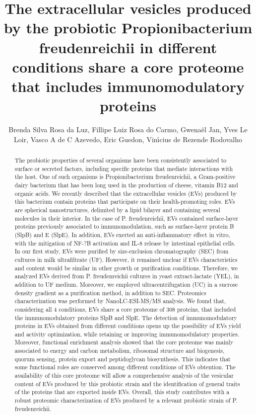\documentclass[twoside]{article}
\title{\vspace{-15mm}\fontsize{24pt}{10pt}\selectfont\textbf{ The extracellular vesicles produced by the probiotic Propionibacterium freudenreichii in different conditions share a core proteome that includes immunomodulatory proteins }} %
\author{ Brenda Silva Rosa da Luz,  Fillipe Luiz Rosa do Carmo,  Gwenaël Jan,  Yves Le Loir,  Vasco A de C Azevedo,  Eric Guedon,  Vin\'{\i}cius de Rezende Rodovalho }
\affil{ INAPG- Fran\c{c}a,  UNIVERSIDADE FEDERAL DE MINAS GERAIS,  UNIVERSIDADE FEDERAL DE MINAS GERAIS }
\date{}
\begin{document}
  
  
  \maketitle %
  
  
  \thispagestyle{fancy} %
  
  
  \begin{abstract}
  The probiotic properties of several organisms have been consistently associated to surface or secreted factors,  including specific proteins that mediate interactions with the host. One of such organisms is Propionibacterium freudenreichii,  a Gram-positive dairy bacterium that has been long used in the production of cheese,  vitamin B12 and organic acids. We recently described that the extracellular vesicles (EVs) produced by this bacterium contain proteins that participate on their health-promoting roles. EVs are spherical nanostructures,  delimited by a lipid bilayer and containing several molecules in their interior. In the case of P. freudenreichii,  EVs contained surface-layer proteins previously associated to immunomodulation,  such as surface-layer protein B (SlpB) and E (SlpE). In addition,  EVs exerted an anti-inflammatory effect in vitro,  with the mitigation of NF-?B activation and IL-8 release by intestinal epithelial cells. In our first study,  EVs were purified by size-exclusion chromatography (SEC) from cultures in milk ultrafiltrate (UF). However,  it remained unclear if EVs characteristics and content would be similar in other growth or purification conditions. Therefore,  we analyzed EVs derived from P. freudenreichii cultures in yeast extract-lactate (YEL),  in addition to UF medium. Moreover,  we employed ultracentrifugation (UC) in a sucrose density gradient as a purification method,  in addition to SEC. Proteomics characterization was performed by NanoLC-ESI-MS/MS analysis. We found that,  considering all 4 conditions,  EVs share a core proteome of 308 proteins,  that included the immunomodulatory proteins SlpB and SlpE. The detection of immunomodulatory proteins in EVs obtained from different conditions opens up the possibility of EVs yield and activity optimization,  while retaining or improving immunomodulatory properties. Moreover,  functional enrichment analysis showed that the core proteome was mainly associated to energy and carbon metabolism,  ribosomal structure and biogenesis,  quorum sensing,  protein export and peptidoglycan biosynthesis. This indicates that some functional roles are conserved among different conditions of EVs obtention. The availability of this core proteome will allow a comprehensive analysis of the vesicular content of EVs produced by this probiotic strain and the identification of general traits of the proteins that are exported inside EVs. Overall,  this study contributes with a robust proteomic characterization of EVs produced by a relevant probiotic strain of P. freudenreichii.
  

\end{abstract}
\end{document}
